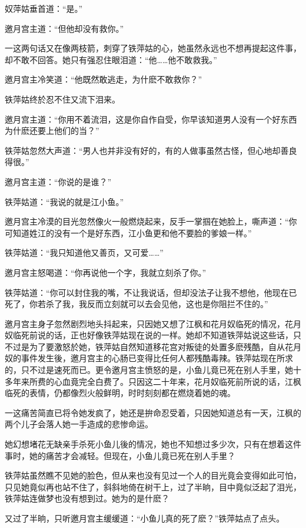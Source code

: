 \documentclass[12pt,oneside]{book}
\begin{document}
奴萍姑垂首道：``是。''

邀月宫主道：``但他却没有救你。''

一这两句话又在像两枝箭，刺穿了铁萍姑的心，她虽然永远也不想再提起这件事，却不敢不回答。她只有强忍住眼泪道：``他\ldots\ldots 他不敢救我。''

邀月宫主冷笑道：``他既然敢逃走，为什麽不敢救你？''

铁萍姑终於忍不住又流下泪来。

邀月宫主道：``你用不着流泪，这是你自作自受，你早该知道男人没有一个好东西为什麽还要上他们的当？''

铁萍姑忽然大声道：``男人也并非没有好的，有的人做事虽然古怪，但心地却善良得很。''

邀月宫主道：``你说的是谁？''

铁萍姑道：``我说的就是江小鱼。''

邀月宫主冷漠的目光忽然像火一般燃烧起来，反手一掌掴在她脸上，嘶声道：``你可知道姓江的没有一个是好东西，江小鱼更和他不要脸的爹娘一样。''

铁萍姑道：``我只知道他又善页，又可爱\ldots\ldots{}''

邀月宫主怒喝道：``你再说他一个字，我就立刻杀了你。''

铁萍姑道：``你可以封住我的嘴，不让我说话，但却没法子让我不想他，他现在已死了，你若杀了我，我反而立刻就可以去会见他，这也是你阻拦不住的。''

邀月宫主身子忽然剧烈地头抖起来，只因她又想了江枫和花月奴临死的情况，花月奴临死前说的话，正也好像铁萍姑现在说的一样。她却不知道铁萍姑说这些话，只不过是为了要激怒於她，铁萍姑自然知道移花宫对叛徒的处置多麽残酷，自从花月奴的事件发生後，邀月宫主的心肠已变得比任何人都残酷毒辣。铁萍姑现在所求的，只不过是速死而已。更令邀月宫主愤怒的是，小鱼儿竟已死在别人手里，她十多年来所费的心血竟完全白费了。只因这二十年来，花月奴临死前所说的话，江枫临死的表情，仍都像烈火般鲜明，时时刻刻都在燃烧着她的魂。

一这痛苦简直已将令她发疯了，她还是拚命忍受着，只因她知道总有一天，江枫的两个儿子会落人她一手造成的悲惨命运。

她幻想堵花无缺亲手杀死小鱼儿後的情况，她也不知想过多少次，只有在想着这件事时，她的痛苦才会减轻。但现在，小鱼儿竟已死在别人手里？

铁萍姑虽然瞧不见她的脸色，但从来也没有见过一个人的目光竟会变得如此可怕，只见她竟似再也站不住了，斜斜地倚在树干上，过了半晌，目中竟似泛起了泪光，铁萍姑连做梦也没有想到过。她为的是什麽？

又过了半晌，只听邀月宫主缓缓道：``小鱼儿真的死了麽？''铁萍姑点了点头。
\end{document}
